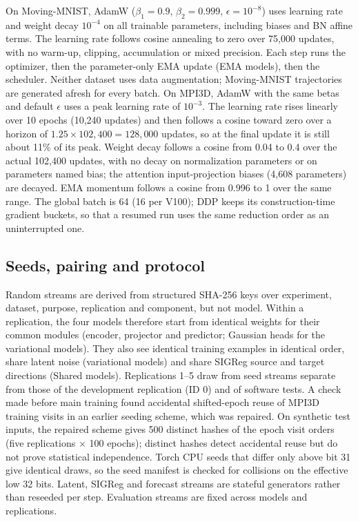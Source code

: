 On Moving-MNIST, AdamW ($\beta_1=0.9$, $\beta_2=0.999$, $\epsilon=10^{-8}$) uses learning rate and weight decay $10^{-4}$ on all trainable parameters, including biases and BN affine terms. The learning rate follows cosine annealing to zero over 75{,}000 updates, with no warm-up, clipping, accumulation or mixed precision. Each step runs the optimizer, then the parameter-only EMA update (EMA models), then the scheduler. Neither dataset uses data augmentation; Moving-MNIST trajectories are generated afresh for every batch. On MPI3D, AdamW with the same betas and default $\epsilon$ uses a peak learning rate of $10^{-3}$. The learning rate rises linearly over 10 epochs (10{,}240 updates) and then follows a cosine toward zero over a horizon of $1.25\times102{,}400=128{,}000$ updates, so at the final update it is still about 11\% of its peak. Weight decay follows a cosine from 0.04 to 0.4 over the actual 102{,}400 updates, with no decay on normalization parameters or on parameters named bias; the attention input-projection biases (4{,}608 parameters) are decayed. EMA momentum follows a cosine from 0.996 to 1 over the same range. The global batch is 64 (16 per V100); DDP keeps its construction-time gradient buckets, so that a resumed run uses the same reduction order as an uninterrupted one.

\subsection{Seeds, pairing and protocol}
\label{app:seeds}

Random streams are derived from structured SHA-256 keys over experiment, dataset, purpose, replication and component, but not model. Within a replication, the four models therefore start from identical weights for their common modules (encoder, projector and predictor; Gaussian heads for the variational models). They also see identical training examples in identical order, share latent noise (variational models) and share SIGReg source and target directions (Shared models). Replications 1--5 draw from seed streams separate from those of the development replication (ID 0) and of software tests. A check made before main training found accidental shifted-epoch reuse of MPI3D training visits in an earlier seeding scheme, which was repaired. On synthetic test inputs, the repaired scheme gives 500 distinct hashes of the epoch visit orders (five replications $\times$ 100 epochs); distinct hashes detect accidental reuse but do not prove statistical independence. Torch CPU seeds that differ only above bit 31 give identical draws, so the seed manifest is checked for collisions on the effective low 32 bits. Latent, SIGReg and forecast streams are stateful generators rather than reseeded per step. Evaluation streams are fixed across models and replications.

